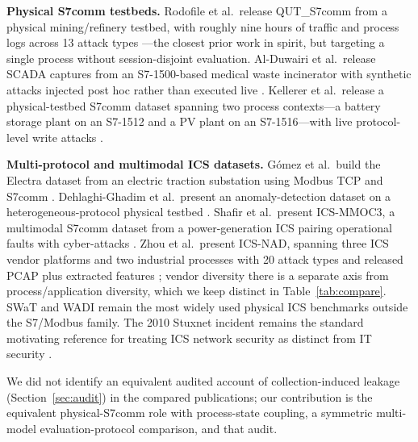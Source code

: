 \documentclass[conference]{IEEEtran}
\begin{document}
\textbf{Physical S7comm testbeds.} Rodofile et al.\ release QUT\_S7comm from a physical mining/refinery
testbed, with roughly nine hours of traffic and process logs across 13 attack types \cite{b3}---the
closest prior work in spirit, but targeting a single process without session-disjoint evaluation.
Al-Duwairi et al.\ release SCADA captures from an S7-1500-based medical waste incinerator with synthetic
attacks injected post hoc rather than executed live \cite{b4}. Kellerer et al.\ release a physical-testbed
S7comm dataset spanning two process contexts---a battery storage plant on an S7-1512 and a PV plant on an
S7-1516---with live protocol-level write attacks \cite{b10,b11}.

\textbf{Multi-protocol and multimodal ICS datasets.} G\'omez et al.\ build the Electra dataset from an
electric traction substation using Modbus TCP and S7comm \cite{b5}. Dehlaghi-Ghadim et al.\ present an
anomaly-detection dataset on a heterogeneous-protocol physical testbed \cite{b6}. Shafir et al.\ present
ICS-MMOC3, a multimodal S7comm dataset from a power-generation ICS pairing operational faults with
cyber-attacks \cite{b12}. Zhou et al.\ present ICS-NAD, spanning three ICS vendor platforms and two
industrial processes with 20 attack types and released PCAP plus extracted features \cite{b13}; vendor
diversity there is a separate axis from process/application diversity, which we keep distinct in
Table~\ref{tab:compare}. SWaT \cite{b7} and WADI \cite{b8} remain the most widely used physical ICS
benchmarks outside the S7/Modbus family. The 2010 Stuxnet incident remains the standard motivating
reference for treating ICS network security as distinct from IT security \cite{b9}.

We did not identify an equivalent audited account of collection-induced leakage
(Section~\ref{sec:audit}) in the compared publications; our contribution is the equivalent physical-S7comm
role with process-state coupling, a symmetric multi-model evaluation-protocol comparison, and that audit.
\end{document}
